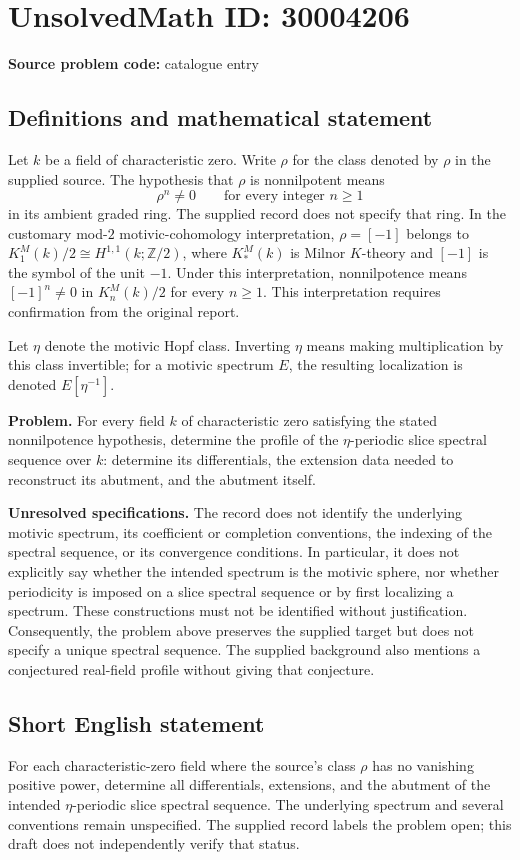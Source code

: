 \documentclass[11pt]{article}
\begin{document}
\section*{UnsolvedMath ID: 30004206}
\textbf{Source problem code:} catalogue entry
\subsection{Definitions and mathematical statement}
Let \(k\) be a field of characteristic zero. Write \(\rho\) for the class denoted by \(\rho\) in the supplied source. The hypothesis that \(\rho\) is nonnilpotent means
\[
\rho^n\ne 0\qquad\text{for every integer }n\ge 1
\]
in its ambient graded ring. The supplied record does not specify that ring. In the customary mod-\(2\) motivic-cohomology interpretation, \(\rho=[-1]\) belongs to \(K_1^M(k)/2\cong H^{1,1}(k;\mathbb Z/2)\), where \(K_*^M(k)\) is Milnor \(K\)-theory and \([-1]\) is the symbol of the unit \(-1\). Under this interpretation, nonnilpotence means \([-1]^n\ne0\) in \(K_n^M(k)/2\) for every \(n\ge1\). This interpretation requires confirmation from the original report.

Let \(\eta\) denote the motivic Hopf class. Inverting \(\eta\) means making multiplication by this class invertible; for a motivic spectrum \(E\), the resulting localization is denoted \(E[\eta^{-1}]\).

\textbf{Problem.} For every field \(k\) of characteristic zero satisfying the stated nonnilpotence hypothesis, determine the profile of the \(\eta\)-periodic slice spectral sequence over \(k\): determine its differentials, the extension data needed to reconstruct its abutment, and the abutment itself.

\textbf{Unresolved specifications.} The record does not identify the underlying motivic spectrum, its coefficient or completion conventions, the indexing of the spectral sequence, or its convergence conditions. In particular, it does not explicitly say whether the intended spectrum is the motivic sphere, nor whether periodicity is imposed on a slice spectral sequence or by first localizing a spectrum. These constructions must not be identified without justification. Consequently, the problem above preserves the supplied target but does not specify a unique spectral sequence. The supplied background also mentions a conjectured real-field profile without giving that conjecture.
\subsection{Short English statement}
For each characteristic-zero field where the source's class \(\rho\) has no vanishing positive power, determine all differentials, extensions, and the abutment of the intended \(\eta\)-periodic slice spectral sequence. The underlying spectrum and several conventions remain unspecified. The supplied record labels the problem open; this draft does not independently verify that status.
\end{document}
